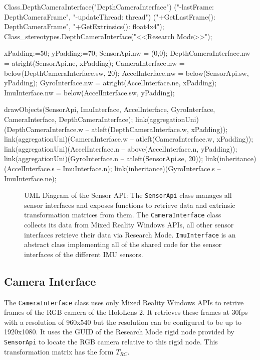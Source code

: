 \begin{empfile}[SensorApiUML]
\begin{empdef}[SensorApiUML]
    Class.DepthCameraInterface("DepthCameraInterface")
            ("-lastFrame: DepthCameraFrame",
             "-updateThread: thread")
            ("+GetLastFrame(): DepthCameraFrame",
             "+GetExtrinsics(): float4x4");
    Class_stereotypes.DepthCameraInterface("<<Research Mode>>");
    
    xPadding:=50;
    yPadding:=70;
    SensorApi.nw = (0,0);
    DepthCameraInterface.nw = atright(SensorApi.ne, xPadding);
    CameraInterface.nw = below(DepthCameraInterface.sw, 20);
    AccelInterface.nw = below(SensorApi.sw, yPadding);
    GyroInterface.nw = atright(AccelInterface.ne, xPadding);
    ImuInterface.nw = below(AccelInterface.sw, yPadding);
    
    drawObjects(SensorApi, ImuInterface, AccelInterface, GyroInterface, CameraInterface, DepthCameraInterface);
    link(aggregationUni)(DepthCameraInterface.w -- atleft(DepthCameraInterface.w, xPadding));
    link(aggregationUni)(CameraInterface.w -- atleft(CameraInterface.w, xPadding));
    link(aggregationUni)(AccelInterface.n -- above(AccelInterface.n, yPadding));
    link(aggregationUni)(GyroInterface.n -- atleft(SensorApi.se, 20));
    link(inheritance)(AccelInterface.s -- ImuInterface.n);
    link(inheritance)(GyroInterface.s -- ImuInterface.ne);
\end{empdef}
\end{empfile}
\begin{figure}
    \centering
    \caption[UML Diagram of the Sensor API]{UML Diagram of the Sensor API: The \lstinline{SensorApi} class manages all sensor interfaces and exposes functions to retrieve data and extrinsic transformation matrices from them. The \lstinline{CameraInterface} class collects its data from Mixed Reality Windows APIs, all other sensor interfaces retrieve their data via Research Mode. \lstinline{ImuInterface} is an abstract class implementing all of the shared code for the sensor interfaces of the different IMU sensors. 
      \label{fig:SensorApiUML}}
\end{figure}

\subsection{Camera Interface}

The \lstinline{CameraInterface} class uses only Mixed Reality Windows APIs to retrive frames of the RGB camera of the HoloLens 2. It retrieves these frames at 30fps with a resolution of 960x540 but the resolution can be configured to be up to 1920x1080. It uses the GUID of the Research Mode rigid node provided by \lstinline{SensorApi} to locate the RGB camera relative to this rigid node. This transformation matrix has the form $T_{RC}$.


